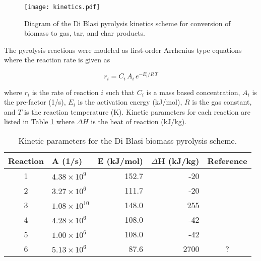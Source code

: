 \begin{figure}[H]
    \centering
    \texttt{[image: kinetics.pdf]}
    \caption{Diagram of the Di Blasi pyrolysis kinetics scheme for conversion of biomass to gas, tar, and char products.}
    \label{fig:blasi}
\end{figure}

The pyrolysis reactions were modeled as first-order Arrhenius type equations where the reaction rate is given as

\begin{equation}
    r_i = C_i\,A_i\,e^{-E_i / R\,T}
\end{equation}

\noindent where $r_i$ is the rate of reaction $i$ such that $C_i$ is a mass based concentration, $A_i$ is the pre-factor (1/s), $E_i$ is the activation energy (kJ/mol), $R$ is the gas constant, and $T$ is the reaction temperature (K). Kinetic parameters for each reaction are listed in Table \ref{tab:kinetic-params} where $\Delta H$ is the heat of reaction (kJ/kg).

\begin{table}[H]
    \centering
    \caption{Kinetic parameters for the Di Blasi biomass pyrolysis scheme.}
    \begin{tabular}{clrrc}
        \toprule
        Reaction    & A (1/s)               & E (kJ/mol) & $\Delta$H (kJ/kg) & Reference \\
        \midrule
        1           & $4.38 \times 10^9$    & 152.7      & -20               & \cite{Blasi-2001} \\
        2           & $3.27 \times 10^6$    & 111.7      & -20               & \cite{Blasi-2001} \\
        3           & $1.08 \times 10^{10}$ & 148.0      & 255               & \cite{Blasi-2001} \\
        4           & $4.28 \times 10^6$    & 108.0      & -42               & \cite{Blasi-1993} \\
        5           & $1.00 \times 10^6$    & 108.0      & -42               & \cite{Blasi-1993} \\
        6           & $5.13 \times 10^6$    & 87.6       & 2700              & ? \\
        \bottomrule
    \end{tabular}
    \label{tab:kinetic-params}
\end{table}


